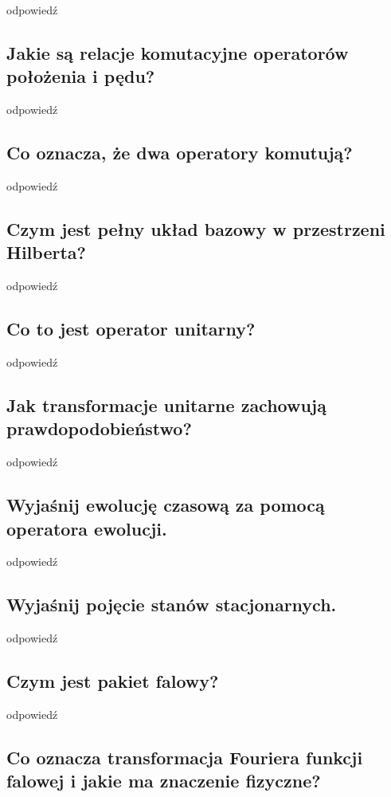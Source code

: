 odpowiedź

\subsection{Jakie są relacje komutacyjne operatorów położenia i pędu?}

odpowiedź

\subsection{Co oznacza, że dwa operatory komutują?}

odpowiedź

\subsection{Czym jest pełny układ bazowy w przestrzeni Hilberta?}

odpowiedź

\subsection{Co to jest operator unitarny?}

odpowiedź

\subsection{Jak transformacje unitarne zachowują prawdopodobieństwo?}

odpowiedź

\subsection{Wyjaśnij ewolucję czasową za pomocą operatora ewolucji.}

odpowiedź

\subsection{Wyjaśnij pojęcie stanów stacjonarnych.}

odpowiedź

\subsection{Czym jest pakiet falowy?}

odpowiedź

\subsection{Co oznacza transformacja Fouriera funkcji falowej i jakie ma znaczenie fizyczne?}

